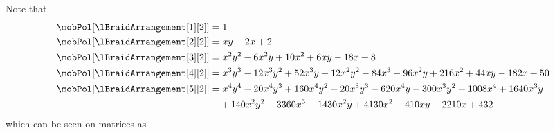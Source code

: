 Note that
\begin{align*}
\mobPol[{\lBraidArrangement[1][2]}] & = 1 \\
\mobPol[{\lBraidArrangement[2][2]}] & = x y - 2 x + 2 \\
\mobPol[{\lBraidArrangement[3][2]}] & = x^2 y^2 - 6 x^2 y + 10 x^2 + 6 x y - 18 x + 8 \\
\mobPol[{\lBraidArrangement[4][2]}] & = x^3 y^3 - 12 x^3 y^2 + 52 x^3 y + 12 x^2 y^2 - 84 x^3 - 96 x^2 y + 216 x^2 + 44 x y - 182 x + 50 \\
\mobPol[{\lBraidArrangement[5][2]}] & = x^4 y^4 - 20 x^4 y^3 + 160 x^4 y^2 + 20 x^3 y^3 - 620 x^4 y - 300 x^3 y^2 + 1008 x^4 + 1640 x^3 y \\ & \quad+ 140 x^2 y^2 - 3360 x^3 - 1430 x^2 y + 4130 x^2 + 410 x y - 2210 x + 432
\end{align*}
which can be seen on matrices as
